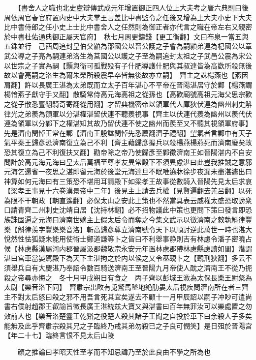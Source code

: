 　　【書舍人之職也北史盧辯傳武成元年增置御正四人位上大夫考之唐六典則曰後周依周官春官府置内史中大夫掌王言盖比中書監令之任後又增為上大夫小史下大夫比中書侍郎之任小史上士比中書舍人之任然則為御正者亦代言之職在帝左右又親密於中書杜佑通典御正屬天官府】　秋七月周更鑄錢【更工衡翻】文曰布泉一當五與五銖並行　己酉周追封皇伯父顥為邵國公以晉公護之子會為嗣顥弟連為杞國公以章武公導之子亮為嗣連弟洛生為莒國公以護之子至為嗣追封太祖之子武邑公震為宋公以世宗之子實為嗣【顥與衛可孤戰殁有子什肥導護什肥與其叔連皆為高歡所殺無後故以會亮嗣之洛生為爾朱榮所殺震早卒皆無後故亦立嗣】　齊主之誅楊燕也【燕因肩翻】許以長廣王湛為太弟既而立太子百年湛心不平帝在晉陽湛居守於鄴【楊燕謂楊愔燕子獻守手又翻】散騎常侍高元海高祖之從孫也【高歡廟號高祖元海父思宗歡之從子散悉亶翻騎奇寄翻從用翻】才留典機密帝以領軍代人庫狄伏連為幽州刺史斛律光之弟羨為領軍以分湛權湛留伏連不聽羨視事【齊主以伏連代羨為幽州以羨代伏連為領軍以分鄴下之權湛知其故乃留伏連不使之幽州而羨至又不聽其視領軍府事】先是濟南閔悼王常在鄴【濟南王殷諡閔悼先悉薦翻濟子禮翻】望氣者言鄴中有天子氣平秦王歸彥恐濟南復立為己不利【齊主藉歸彥握兵以殺楊燕楊燕死而濟南廢矣故恐其復立為己不利復扶又翻】勸帝除之帝乃使歸彥至鄴徵濟南王如晉陽湛内不自安問計於高元海元海曰皇太后萬福至尊孝友異常殿下不須異慮湛曰此豈我推誠之意邪元海乞還省一夜思之湛即留元海於後堂元海達旦不眠唯遶牀徐步夜漏未盡湛遽出曰神算如何元海曰有三策恐不堪用耳請殿下如梁孝王故事從數騎入晉陽先見太后求哀【梁孝王事見十六卷漢景帝中二年】後見主上請去兵權【見賢遍翻去羌呂翻】以死為限不干朝政【朝直遙翻】必保太山之安此上策也不然當具表云威權太盛恐取謗衆口請青齊二州刺史沈靖自居【沈持林翻】必不招物議此中策也更問下策曰發言即恐族誅固逼之元海曰濟南世嫡主上假太后令而奪之今集文武示以徵濟南之敕執斛律豐樂【斛律羨字豐樂樂音洛】斬高歸彥尊立濟南號令天下以順討逆此萬世一時也湛大悅然性怯狐疑未能用使術士鄭道謙等卜之皆曰不利舉事静則吉有林慮令潘子密曉占候【林慮縣漢屬河内郡晉屬汲郡魏敬宗永安元年置林慮郡帶林慮縣慮讀如閭】潛謂湛曰宫車當晏駕殿下為天下主湛拘之於内以候之又令巫覡卜之【覡刑狄翻】多云不須舉兵自有大慶湛乃奉詔令數百騎送濟南王至晉陽九月帝使人酖之濟南王不從乃扼殺之帝尋亦悔之　冬十月甲戌朔日有食之　丙子齊以彭城王浟為太保長樂王尉粲為太尉【樂音洛下同】　齊肅宗出畋有兎驚馬墜地絶肋婁太后視疾問濟南所在者三齊主不對太后怒曰殺之邪不用吾言死其宜矣遂去不顧十一月甲辰詔以嗣子冲眇可遣尚書右僕射趙郡王叡諭旨徵長廣王湛統兹大寶又與湛書曰百年無罪汝可以樂處置之勿效前人也【樂音洛楚靈王乾谿之役楚人殺其諸子王聞之自投於車下曰余殺人子多矣能無及此乎齊肅宗殺其兄之子臨終乃戒其弟勿殺已之子良可憫笑】是日殂於晉陽宫【年二十七】臨終言恨不見太后山陵

　　顔之推論曰孝昭天性至孝而不知忌諱乃至於此良由不學之所為也

